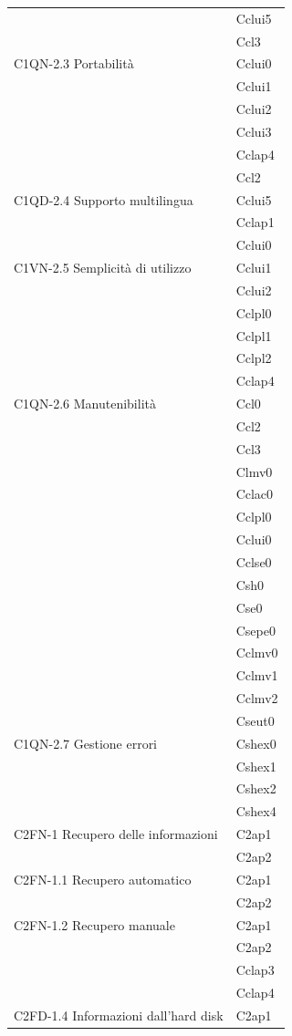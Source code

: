 \begin{footnotesize}
\begin{longtable}[!h]{|l|l|}
& Cclui5\\
& Ccl3\\\hline 
C1QN-2.3 Portabilit\`a & Cclui0\\
& Cclui1\\
& Cclui2\\
& Cclui3\\
& Cclap4\\
& Ccl2\\\hline   
C1QD-2.4 Supporto multilingua & Cclui5\\    
& Cclap1\\
& Cclui0\\\hline                
C1VN-2.5 Semplicit\`a di utilizzo & Cclui1\\
& Cclui2\\
& Cclpl0\\
& Cclpl1\\
& Cclpl2\\
& Cclap4\\\hline
C1QN-2.6 Manutenibilit\`a & Ccl0\\
& Ccl2\\
& Ccl3\\
& Clmv0\\
& Cclac0\\
& Cclpl0\\
& Cclui0\\
& Cclse0\\
& Csh0\\
& Cse0\\
& Csepe0\\
& Cclmv0\\
& Cclmv1\\
& Cclmv2\\
& Cseut0\\\hline                    
C1QN-2.7 Gestione errori  & Cshex0\\
& Cshex1\\
& Cshex2\\
& Cshex4\\\hline     
C2FN-1 Recupero delle informazioni & C2ap1 \\
& C2ap2\\\hline  
C2FN-1.1 Recupero automatico &  C2ap1 \\
& C2ap2\\\hline
C2FN-1.2 Recupero manuale &  C2ap1\\
&  C2ap2 \\
&  Cclap3\\
&  Cclap4\\\hline  
C2FD-1.4 Informazioni dall'hard disk & C2ap1 \\

\end{longtable}
\end{footnotesize}
